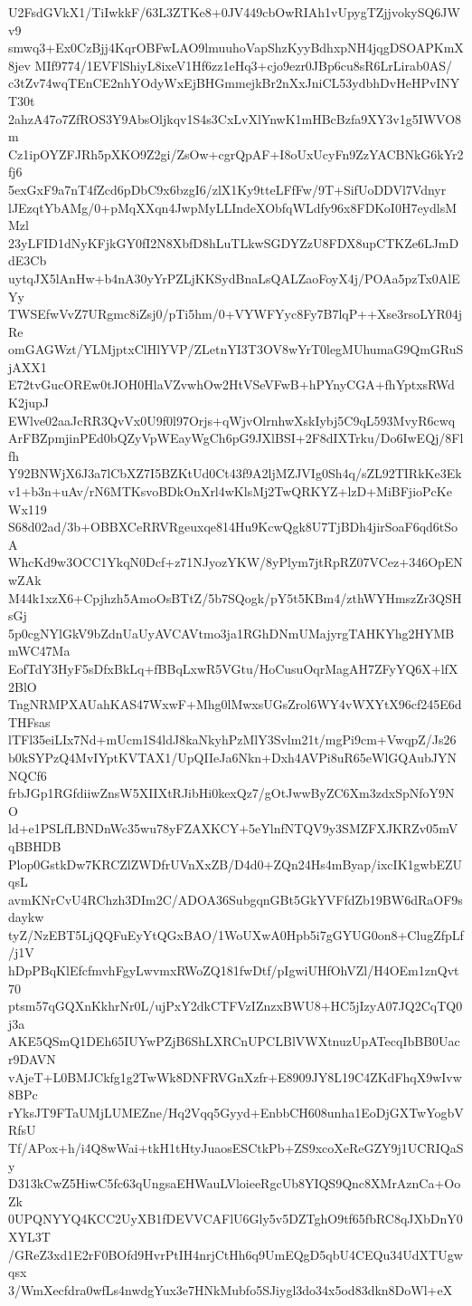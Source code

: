 U2FsdGVkX1/TiIwkkF/63L3ZTKe8+0JV449cbOwRIAh1vUpygTZjjvokySQ6JWv9
smwq3+Ex0CzBjj4KqrOBFwLAO9lmuuhoVapShzKyyBdhxpNH4jqgDSOAPKmX8jev
MIf9774/1EVFlShiyL8ixeV1Hf6zz1eHq3+cjo9ezr0JBp6cu8sR6LrLirab0AS/
c3tZv74wqTEnCE2nhYOdyWxEjBHGmmejkBr2nXxJniCL53ydbhDvHeHPvINYT30t
2ahzA47o7ZfROS3Y9AbsOljkqv1S4s3CxLvXlYnwK1mHBcBzfa9XY3v1g5IWVO8m
Cz1ipOYZFJRh5pXKO9Z2gi/ZsOw+cgrQpAF+I8oUxUcyFn9ZzYACBNkG6kYr2fj6
5exGxF9a7nT4fZcd6pDbC9x6bzgI6/zlX1Ky9tteLFfFw/9T+SifUoDDVl7Vdnyr
lJEzqtYbAMg/0+pMqXXqn4JwpMyLLIndeXObfqWLdfy96x8FDKoI0H7eydlsMMzl
23yLFID1dNyKFjkGY0fI2N8XbfD8hLuTLkwSGDYZzU8FDX8upCTKZe6LJmDdE3Cb
uytqJX5lAnHw+b4nA30yYrPZLjKKSydBnaLsQALZaoFoyX4j/POAa5pzTx0AlEYy
TWSEfwVvZ7URgmc8iZsj0/pTi5hm/0+VYWFYyc8Fy7B7lqP++Xse3rsoLYR04jRe
omGAGWzt/YLMjptxClHlYVP/ZLetnYI3T3OV8wYrT0legMUhumaG9QmGRuSjAXX1
E72tvGucOREw0tJOH0HlaVZvwhOw2HtVSeVFwB+hPYnyCGA+fhYptxsRWdK2jupJ
EWlve02aaJcRR3QvVx0U9f0l97Orjs+qWjvOlrnhwXskIybj5C9qL593MvyR6cwq
ArFBZpmjinPEd0bQZyVpWEayWgCh6pG9JXlBSI+2F8dIXTrku/Do6IwEQj/8Flfh
Y92BNWjX6J3a7lCbXZ7I5BZKtUd0Ct43f9A2ljMZJVIg0Sh4q/sZL92TIRkKe3Ek
v1+b3n+uAv/rN6MTKsvoBDkOnXrl4wKlsMj2TwQRKYZ+lzD+MiBFjioPcKeWx119
S68d02ad/3b+OBBXCeRRVRgeuxqe814Hu9KcwQgk8U7TjBDh4jirSoaF6qd6tSoA
WhcKd9w3OCC1YkqN0Dcf+z71NJyozYKW/8yPlym7jtRpRZ07VCez+346OpENwZAk
M44k1xzX6+Cpjhzh5AmoOsBTtZ/5b7SQogk/pY5t5KBm4/zthWYHmszZr3QSHsGj
5p0cgNYlGkV9bZdnUaUyAVCAVtmo3ja1RGhDNmUMajyrgTAHKYhg2HYMBmWC47Ma
EofTdY3HyF5sDfxBkLq+fBBqLxwR5VGtu/HoCusuOqrMagAH7ZFyYQ6X+lfX2BlO
TngNRMPXAUahKAS47WxwF+Mhg0lMwxsUGsZrol6WY4vWXYtX96cf245E6dTHFsas
lTFl35eiLIx7Nd+mUcm1S4ldJ8kaNkyhPzMlY3Svlm21t/mgPi9cm+VwqpZ/Js26
b0kSYPzQ4MvIYptKVTAX1/UpQIIeJa6Nkn+Dxh4AVPi8uR65eWlGQAubJYNNQCf6
frbJGp1RGfdiiwZnsW5XIIXtRJibHi0kexQz7/gOtJwwByZC6Xm3zdxSpNfoY9NO
ld+e1PSLfLBNDnWc35wu78yFZAXKCY+5eYlnfNTQV9y3SMZFXJKRZv05mVqBBHDB
Plop0GstkDw7KRCZlZWDfrUVnXxZB/D4d0+ZQn24Hs4mByap/ixcIK1gwbEZUqsL
avmKNrCvU4RChzh3DIm2C/ADOA36SubgqnGBt5GkYVFfdZb19BW6dRaOF9sdaykw
tyZ/NzEBT5LjQQFuEyYtQGxBAO/1WoUXwA0Hpb5i7gGYUG0on8+ClugZfpLf/j1V
hDpPBqKlEfcfmvhFgyLwvmxRWoZQ181fwDtf/pIgwiUHfOhVZl/H4OEm1znQvt70
ptsm57qGQXnKkhrNr0L/ujPxY2dkCTFVzIZnzxBWU8+HC5jIzyA07JQ2CqTQ0j3a
AKE5QSmQ1DEh65IUYwPZjB6ShLXRCnUPCLBlVWXtnuzUpATecqIbBB0Uacr9DAVN
vAjeT+L0BMJCkfg1g2TwWk8DNFRVGnXzfr+E8909JY8L19C4ZKdFhqX9wIvw8BPc
rYksJT9FTaUMjLUMEZne/Hq2Vqq5Gyyd+EnbbCH608unha1EoDjGXTwYogbVRfsU
Tf/APox+h/i4Q8wWai+tkH1tHtyJuaosESCtkPb+ZS9xcoXeReGZY9j1UCRIQaSy
D313kCwZ5HiwC5fc63qUngsaEHWauLVloieeRgcUb8YIQS9Qnc8XMrAznCa+OoZk
0UPQNYYQ4KCC2UyXB1fDEVVCAFlU6Gly5v5DZTghO9tf65fbRC8qJXbDnY0XYL3T
/GReZ3xd1E2rF0BOfd9HvrPtIH4nrjCtHh6q9UmEQgD5qbU4CEQu34UdXTUgwqsx
3/WmXecfdra0wfLs4nwdgYux3e7HNkMubfo5SJiygl3do34x5od83dkn8DoWl+eX
